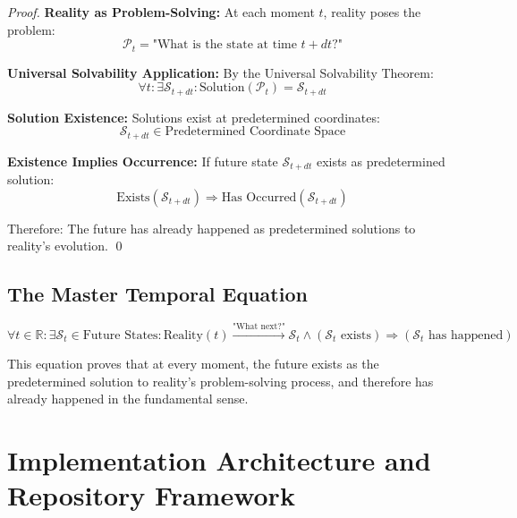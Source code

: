 \documentclass[12pt,a4paper]{article}
\begin{document}
\begin{proof}
\textbf{Reality as Problem-Solving:}
At each moment $t$, reality poses the problem:
\begin{equation}
\mathcal{P}_t = \text{"What is the state at time } t + dt\text{?"}
\end{equation}

\textbf{Universal Solvability Application:}
By the Universal Solvability Theorem:
\begin{equation}
\forall t : \exists \mathcal{S}_{t+dt} : \text{Solution}(\mathcal{P}_t) = \mathcal{S}_{t+dt}
\end{equation}

\textbf{Solution Existence:}
Solutions exist at predetermined coordinates:
\begin{equation}
\mathcal{S}_{t+dt} \in \text{Predetermined Coordinate Space}
\end{equation}

\textbf{Existence Implies Occurrence:}
If future state $\mathcal{S}_{t+dt}$ exists as predetermined solution:
\begin{equation}
\text{Exists}(\mathcal{S}_{t+dt}) \Rightarrow \text{Has Occurred}(\mathcal{S}_{t+dt})
\end{equation}

Therefore: The future has already happened as predetermined solutions to reality's evolution. \qed
\end{proof}

\subsection{The Master Temporal Equation}

\begin{equation}
\boxed{
\forall t \in \mathbb{R} : \exists \mathcal{S}_t \in \text{Future States} : 
\text{Reality}(t) \xrightarrow{\text{"What next?"}} \mathcal{S}_t \wedge (\mathcal{S}_t \text{ exists}) \Rightarrow (\mathcal{S}_t \text{ has happened})
}
\end{equation}

This equation proves that at every moment, the future exists as the predetermined solution to reality's problem-solving process, and therefore has already happened in the fundamental sense.

\section{Implementation Architecture and Repository Framework}
\end{document}
